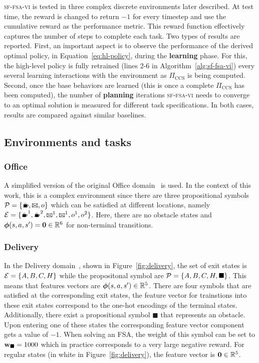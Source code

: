 \textsc{sf-fsa-vi} is tested in three complex discrete environments later described. At test time, the reward is changed to return $-1$ for every timestep and use the cumulative reward as the performance metric. This reward function effectively captures the number of steps to complete each task. Two types of results are reported. First, an important aspect is to observe the performance of the derived optimal policy, in Equation~\eqref{eq:hl-policy}, during the \textbf{learning} phase. For this, the high-level policy is fully retrained (lines 2-6 in Algorithm~\ref{alg:sf-fsa-vi}) every several learning interactions with the environment as $\Pi_\text{CCS}$ is being computed. Second, once the base behaviors are learned (this is once a complete $\Pi_\text{CCS}$ has been computed), the number of \textbf{planning} iterations \textsc{sf-fsa-vi} needs to converge to an optimal solution is measured for different task specifications. In both cases, results are compared against similar baselines.

\subsection{Environments and tasks} 

\subsubsection{Office} A simplified version of the original Office domain~\citep{Icarte2018b} is used. In the context of this work, this is a complex environment since there are three propositional symbols $\cP=\{\text{\coffee}, \text{\mail}, o\}$ which can be satisfied at different locations, namely $\cE=\{\text{\coffee}^1, \text{\coffee}^2, \text{\mail}^1, \text{\mail}^1, o^1, o^2\}$. Here, there are no obstacle states and $\boldsymbol{\phi}(s,a,s')=\mathbf{0}\in\mathbb{R}^6$ for non-terminal transitions.

\begin{figure}
  
\end{figure}


\subsubsection{Delivery} In the Delivery domain~\citep{Araki2021}, shown in Figure~\ref{fig:delivery}, the set of exit states is ${\mathcal{E}=\{A,B,C,H\}}$ while the propositonal symbol are $\mathcal{P}=\{A,B,C,H,\blacksquare\}$. This means that features vectors are $\boldsymbol{\phi}(s,a,s')\in\mathbb{R}^5$. There are four symbols that are satisfied at the corresponding exit states, the feature vector for trainstions into these exit states correspond to the one-hot encodings of the terminal states. Additionally, there exist a propositional symbol $\blacksquare$ that represents an obstacle. Upon entering one of these states the corresponding feature vector component gets a value of $-1$. When solving an FSA, the weight of this symbol can be set to $\mathbf{w}_\blacksquare=1000$ which in practice corresponds to a very large negative reward. For regular states (in white in Figure~\ref{fig:delivery}), the feature vector is $\mathbf{0}\in\mathbb{R}^5$.


